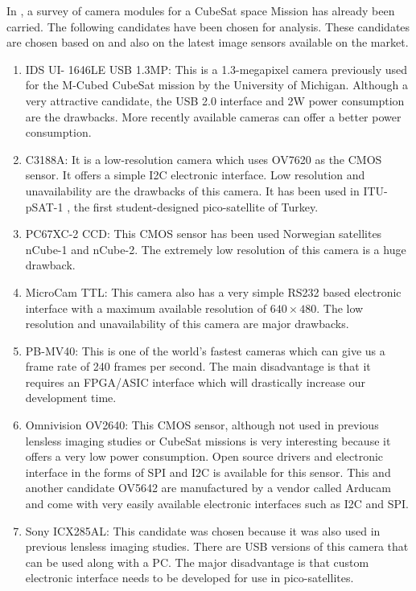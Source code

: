 In \cite{surveyCamMod}, a survey of camera modules for a CubeSat space Mission has already been carried. The following candidates have been chosen for analysis. These candidates are chosen based on \cite{surveyCamMod} and also on the latest image sensors available on the market. 
\begin{enumerate}[label=(\alph*)]
\item IDS UI- 1646LE USB 1.3MP: This is a 1.3-megapixel camera previously used for the M-Cubed CubeSat mission by the University of Michigan\cite{MCubed}. Although a very attractive candidate, the USB 2.0 interface and 2W power consumption are the drawbacks. More recently available cameras can offer a better power consumption. 
\item C3188A: It is a low-resolution camera which uses OV7620 as the CMOS sensor. It offers a simple I2C electronic interface. Low resolution and unavailability are the drawbacks of this camera. It has been used in ITU-pSAT-1 \cite{surveyCamMod}, the first student-designed pico-satellite of Turkey. 
\item PC67XC-2 CCD: This CMOS sensor has been used Norwegian satellites nCube-1 and nCube-2\cite{surveyCamMod}. The extremely low resolution of this camera is a huge drawback.
\item MicroCam TTL: This camera also has a very simple RS232 based electronic interface with a maximum available resolution of $640 \times 480$. The low resolution and unavailability of this camera are major drawbacks. 
\item PB-MV40: This is one of the world's fastest cameras which can give us a frame rate of 240 frames per second. The main disadvantage is that it requires an FPGA/ASIC interface which will drastically increase our development time. 
\item Omnivision OV2640: This CMOS sensor, although not used in previous lensless imaging studies or CubeSat missions is very interesting because it offers a very low power consumption. Open source drivers and electronic interface in the forms of SPI and I2C is available for this sensor. This and another candidate OV5642 are manufactured by a vendor called Arducam and come with very easily available electronic interfaces such as I2C and SPI. 
\item Sony ICX285AL: This candidate was chosen because it was also used in previous lensless imaging studies\cite{Flatcam}. There are USB versions of this camera that can be used along with a PC. The major disadvantage is that custom electronic interface needs to be developed for use in pico-satellites.

\end{enumerate}
